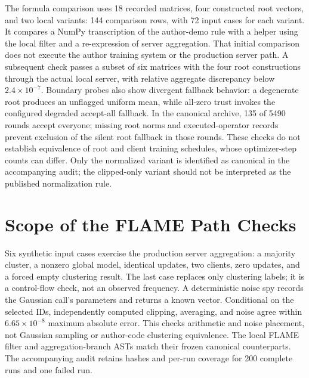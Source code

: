 \documentclass[journal]{IEEEtran}
\begin{document}
The formula comparison uses 18 recorded matrices, four constructed root vectors, and two local variants: 144 comparison rows, with 72 input cases for each variant. It compares a NumPy transcription of the author-demo rule with a helper using the local filter and a re-expression of server aggregation. That initial comparison does not execute the author training system or the production server path. A subsequent check passes a subset of six matrices with the four root constructions through the actual local server, with relative aggregate discrepancy below $2.4\times10^{-7}$. Boundary probes also show divergent fallback behavior: a degenerate root produces an unflagged uniform mean, while all-zero trust invokes the configured degraded accept-all fallback. In the canonical archive, 135 of 5490 rounds accept everyone; missing root norms and executed-operator records prevent exclusion of the silent root fallback in those rounds. These checks do not establish equivalence of root and client training schedules, whose optimizer-step counts can differ. Only the normalized variant is identified as canonical in the accompanying audit; the clipped-only variant should not be interpreted as the published normalization rule.
\section{Scope of the FLAME Path Checks}
Six synthetic input cases exercise the production server aggregation: a majority cluster, a nonzero global model, identical updates, two clients, zero updates, and a forced empty clustering result. The last case replaces only clustering labels; it is a control-flow check, not an observed frequency. A deterministic noise spy records the Gaussian call's parameters and returns a known vector. Conditional on the selected IDs, independently computed clipping, averaging, and noise agree within $6.65\times10^{-8}$ maximum absolute error. This checks arithmetic and noise placement, not Gaussian sampling or author-code clustering equivalence. The local FLAME filter and aggregation-branch ASTs match their frozen canonical counterparts. The accompanying audit retains hashes and per-run coverage for 200 complete runs and one failed run.
\end{document}
